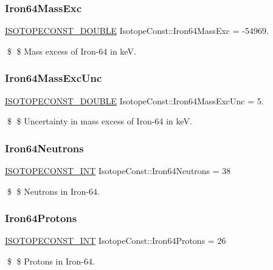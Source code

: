 \subsubsection{\texorpdfstring{Iron64\+Mass\+Exc}{Iron64MassExc}}
{\footnotesize\ttfamily \mbox{\hyperlink{group___isotope_const-_macros_ga8f45a7272ce02c0b4c65c44636ed719a}{I\+S\+O\+T\+O\+P\+E\+C\+O\+N\+S\+T\+\_\+\+D\+O\+U\+B\+LE}} Isotope\+Const\+::\+Iron64\+Mass\+Exc = -\/54969.}

\$ \$ Mass excess of Iron-\/64 in keV. \mbox{\label{group___isotope_const-_iron-_fe64_ga517002bd666c0d952ed9d51ee1effeff}} 
\subsubsection{\texorpdfstring{Iron64\+Mass\+Exc\+Unc}{Iron64MassExcUnc}}
{\footnotesize\ttfamily \mbox{\hyperlink{group___isotope_const-_macros_ga8f45a7272ce02c0b4c65c44636ed719a}{I\+S\+O\+T\+O\+P\+E\+C\+O\+N\+S\+T\+\_\+\+D\+O\+U\+B\+LE}} Isotope\+Const\+::\+Iron64\+Mass\+Exc\+Unc = 5.}

\$ \$ Uncertainty in mass excess of Iron-\/64 in keV. \mbox{\label{group___isotope_const-_iron-_fe64_gabe3bfaceb606db2d3244398da8341bab}} 
\subsubsection{\texorpdfstring{Iron64\+Neutrons}{Iron64Neutrons}}
{\footnotesize\ttfamily \mbox{\hyperlink{group___isotope_const-_macros_ga5f18360b3e99483a35c32d789e62621c}{I\+S\+O\+T\+O\+P\+E\+C\+O\+N\+S\+T\+\_\+\+I\+NT}} Isotope\+Const\+::\+Iron64\+Neutrons = 38}

\$ \$ Neutrons in Iron-\/64. \mbox{\label{group___isotope_const-_iron-_fe64_ga78a9397299e6dfc43f0709b3b15f4ddc}} 
\subsubsection{\texorpdfstring{Iron64\+Protons}{Iron64Protons}}
{\footnotesize\ttfamily \mbox{\hyperlink{group___isotope_const-_macros_ga5f18360b3e99483a35c32d789e62621c}{I\+S\+O\+T\+O\+P\+E\+C\+O\+N\+S\+T\+\_\+\+I\+NT}} Isotope\+Const\+::\+Iron64\+Protons = 26}

\$ \$ Protons in Iron-\/64. 